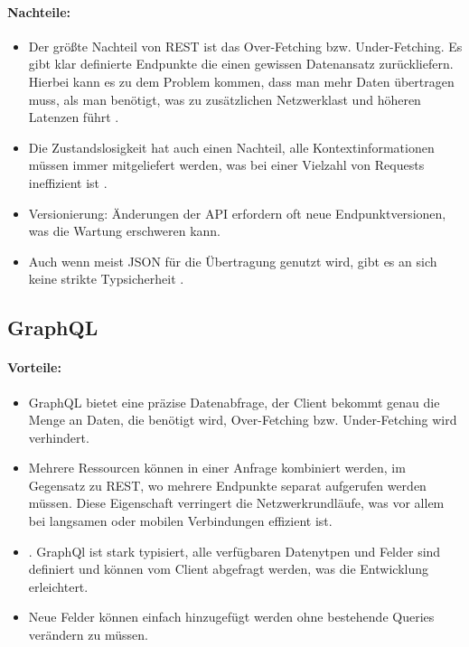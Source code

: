 \paragraph{Nachteile:}
\begin{itemize}
	\item Der größte Nachteil von REST ist das Over-Fetching bzw. Under-Fetching. Es gibt klar definierte Endpunkte die einen gewissen Datenansatz zurückliefern. Hierbei kann es zu dem Problem kommen, dass man mehr Daten übertragen muss, als man benötigt, was zu zusätzlichen Netzwerklast und höheren Latenzen führt \parencite{amazon2025graphql}.
	\item Die Zustandslosigkeit hat auch einen Nachteil, alle Kontextinformationen müssen immer mitgeliefert werden, was bei einer Vielzahl von Requests ineffizient ist \parencite{fielding2000rest}.
	\item Versionierung: Änderungen der API erfordern oft neue Endpunktversionen, was die Wartung erschweren kann.
	\item Auch wenn meist JSON für die Übertragung genutzt wird, gibt es an sich keine strikte Typsicherheit \parencite{redhat-apiguide}. 
\end{itemize}

\subsection{GraphQL}

\paragraph{Vorteile:}
\begin{itemize}
	\item GraphQL bietet eine präzise Datenabfrage, der Client bekommt genau die Menge an Daten, die benötigt wird, Over-Fetching bzw. Under-Fetching wird verhindert.
	\item Mehrere Ressourcen können in einer Anfrage kombiniert werden, im Gegensatz zu REST, wo mehrere Endpunkte separat aufgerufen werden müssen. Diese Eigenschaft verringert die Netzwerkrundläufe, was vor allem bei langsamen oder mobilen Verbindungen effizient ist.
	\item . GraphQl ist stark typisiert, alle verfügbaren Datenytpen und Felder sind definiert und können vom Client abgefragt werden, was die Entwicklung erleichtert. 
	\item Neue Felder können einfach hinzugefügt werden ohne bestehende Queries verändern zu müssen.
\end{itemize}


